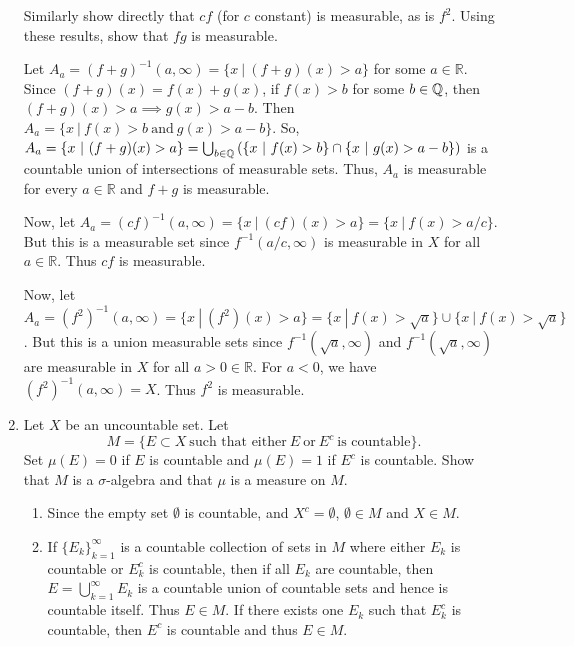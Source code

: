 \documentclass[12pt]{article}
\newcommand{\rl}{\mathbb{R}}
\begin{document}
\begin{enumerate}
Similarly show directly that $cf$ (for $c$ constant) is measurable, as is $f^2$. Using these results, show that $fg$ is measurable.

\begin{mybox}
  Let $A_a=(f+g)^{-1}(a,\infty)=\{x \ | \ (f+g)(x) > a \}$
  for some $a\in \rl$.
  Since $(f+g)(x)=f(x)+g(x)$, if $f(x)>b$ for some
  $b\in \mathbb{Q}$, then
  $(f+g)(x)>a\implies g(x)>a-b$. Then $A_a=
  \{x \ | \ f(x) > b\ \text{and}\ g(x)>a-b\}$.
  So, $A_a =\{x \ | \ (f+g)(x) > a \} =\bigcup_{b \in \mathbb{Q}}
  \left(\{x \ | \ f(x) > b \} \cap \{ x \ | \ g(x) > a-b\}
  \right)$ is a countable union of intersections of
  measurable sets. Thus, $A_a$ is measurable for every
  $a\in \rl$ and $f+g$ is measurable.

  \vspace*{2mm}
  Now, let $A_a=(cf)^{-1}(a,\infty)=\{x \ | \ (cf)(x)>a\}
  =\{x\ |\ f(x)>a/c\}$. But this is a measurable set since
  $f^{-1}(a/c,\infty)$ is measurable in $X$ for all
  $a\in \rl$. Thus $cf$ is measurable.

  \vspace*{2mm}
  Now, let $A_a=(f^2)^{-1}(a,\infty)=\{x \ | \ (f^2)(x)>a\}
  =\{x\ |\ f(x)>\sqrt{a}\}\cup \{x\ |\ f(x)>\sqrt{a}\}$.
  But this is a union measurable sets since
  $f^{-1}(\sqrt{a},\infty)$  and $f^{-1}(\sqrt{a},\infty)$
  are measurable in $X$ for all
  $a>0\in \rl$. For $a<0$, we have $(f^2)^{-1}(a,\infty)
  =X$. Thus $f^2$ is measurable.
\end{mybox}


\item Let $X$ be an uncountable set. Let 
$$ M = \{ E \subset X  \ \text{such that either} \ E \ \text{or}\ E^c \ \text{is countable}\}.$$
Set $\mu(E) = 0$ if $E$ is countable and $\mu(E) = 1$ if $E^c$ is countable. Show that $M$ is a $\sigma$-algebra and that $\mu$ is a measure on $M$. 

\begin{mybox}
  \begin{enumerate}
    \item Since the empty set $\emptyset$ is countable,
      and $X^c=\emptyset$, $\emptyset\in M$ and $X\in M$.

      \vspace*{1mm}
    \item If $\{E_k\}_{k=1}^\infty$ is a countable collection
      of sets in $M$ where either $E_k$ is countable or $E_k^c$
      is countable, then if all $E_k$ are countable, then
      $E=\bigcup_{k=1}^\infty{E_k}$ is a countable union of
      countable sets and hence is countable itself. Thus
      $E\in M$. If there exists one $E_k$ such that
      $E_k^c$ is countable, then $E^c$ is countable and
      thus $E\in M$.


\end{enumerate}
\end{mybox}
\end{enumerate}
\end{document}
